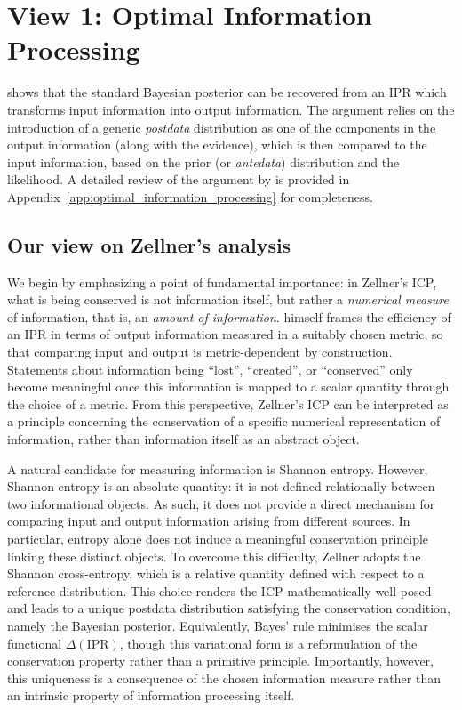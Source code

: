 \documentclass[accepted]{uai2026} %
\theoremstyle{remark}
\begin{document}
%
\section{View 1: Optimal Information Processing}
\label{sec:4}


\citet{zellner1988optimal} shows that the standard Bayesian posterior can be recovered from an IPR which transforms input information into output information. The argument relies on the introduction of a generic \emph{postdata} distribution as one of the components in the output information (along with the evidence), which is then compared to the input information, based on the prior (or \emph{antedata}) distribution and the likelihood. A detailed review of the argument by \citet{zellner1988optimal} is provided in Appendix~\ref{app:optimal_information_processing} for completeness.

\subsection{Our view on Zellner's analysis}
\label{sec:probabilisticIPR}

We begin by emphasizing a point of fundamental importance: in Zellner's ICP, what is being conserved is not information itself, but rather a \emph{numerical measure} of information, that is, an \emph{amount of information}. \citet{zellner1988optimal} himself frames the efficiency of an IPR in terms of output information measured in a suitably chosen metric, so that comparing input and output is metric-dependent by construction. Statements about information being ``lost'', ``created'', or ``conserved'' only become meaningful once this information is mapped to a scalar quantity through the choice of a metric. From this perspective, Zellner's ICP can be interpreted as a principle concerning the conservation of a specific numerical representation of information, rather than information itself as an abstract object.

A natural candidate for measuring information is Shannon entropy. However, Shannon entropy is an absolute quantity: it is not defined relationally between two informational objects. As such, it does not provide a direct mechanism for comparing input and output information arising from different sources. In particular, entropy alone does not induce a meaningful conservation principle linking these distinct objects. To overcome this difficulty, Zellner adopts the Shannon cross-entropy, which is a relative quantity defined with respect to a reference distribution. This choice renders the ICP mathematically well-posed and leads to a unique postdata distribution satisfying the conservation condition, namely the Bayesian posterior. Equivalently, Bayes' rule minimises the scalar functional $\Delta(\text{IPR})$, though this variational form is a reformulation of the conservation property rather than a primitive principle. Importantly, however, this uniqueness is a consequence of the chosen information measure rather than an intrinsic property of information processing itself.
\end{document}
